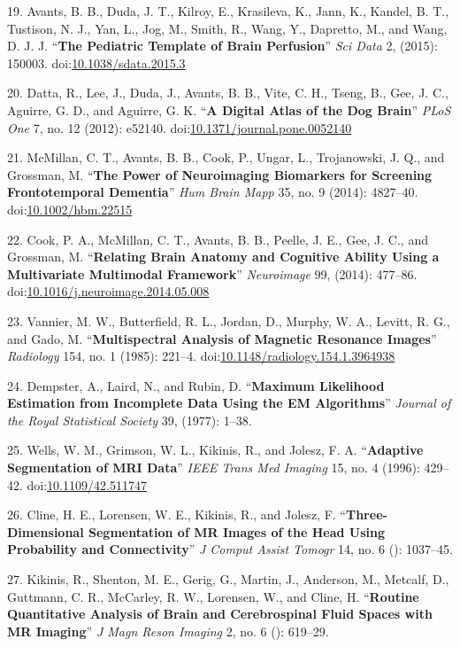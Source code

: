 \documentclass[11pt,]{article}
\begin{document}
19. Avants, B. B., Duda, J. T., Kilroy, E., Krasileva, K., Jann, K.,
Kandel, B. T., Tustison, N. J., Yan, L., Jog, M., Smith, R., Wang, Y.,
Dapretto, M., and Wang, D. J. J. ``\textbf{The Pediatric Template of
Brain Perfusion}'' \emph{Sci Data} 2, (2015): 150003.
doi:\href{http://dx.doi.org/10.1038/sdata.2015.3}{10.1038/sdata.2015.3}

20. Datta, R., Lee, J., Duda, J., Avants, B. B., Vite, C. H., Tseng, B.,
Gee, J. C., Aguirre, G. D., and Aguirre, G. K. ``\textbf{A Digital Atlas
of the Dog Brain}'' \emph{PLoS One} 7, no. 12 (2012): e52140.
doi:\href{http://dx.doi.org/10.1371/journal.pone.0052140}{10.1371/journal.pone.0052140}

21. McMillan, C. T., Avants, B. B., Cook, P., Ungar, L., Trojanowski, J.
Q., and Grossman, M. ``\textbf{The Power of Neuroimaging Biomarkers for
Screening Frontotemporal Dementia}'' \emph{Hum Brain Mapp} 35, no. 9
(2014): 4827--40.
doi:\href{http://dx.doi.org/10.1002/hbm.22515}{10.1002/hbm.22515}

22. Cook, P. A., McMillan, C. T., Avants, B. B., Peelle, J. E., Gee, J.
C., and Grossman, M. ``\textbf{Relating Brain Anatomy and Cognitive
Ability Using a Multivariate Multimodal Framework}'' \emph{Neuroimage}
99, (2014): 477--86.
doi:\href{http://dx.doi.org/10.1016/j.neuroimage.2014.05.008}{10.1016/j.neuroimage.2014.05.008}

23. Vannier, M. W., Butterfield, R. L., Jordan, D., Murphy, W. A.,
Levitt, R. G., and Gado, M. ``\textbf{Multispectral Analysis of Magnetic
Resonance Images}'' \emph{Radiology} 154, no. 1 (1985): 221--4.
doi:\href{http://dx.doi.org/10.1148/radiology.154.1.3964938}{10.1148/radiology.154.1.3964938}

24. Dempster, A., Laird, N., and Rubin, D. ``\textbf{Maximum Likelihood
Estimation from Incomplete Data Using the EM Algorithms}'' \emph{Journal
of the Royal Statistical Society} 39, (1977): 1--38.

25. Wells, W. M., Grimson, W. L., Kikinis, R., and Jolesz, F. A.
``\textbf{Adaptive Segmentation of MRI Data}'' \emph{IEEE Trans Med
Imaging} 15, no. 4 (1996): 429--42.
doi:\href{http://dx.doi.org/10.1109/42.511747}{10.1109/42.511747}

26. Cline, H. E., Lorensen, W. E., Kikinis, R., and Jolesz, F.
``\textbf{Three-Dimensional Segmentation of MR Images of the Head Using
Probability and Connectivity}'' \emph{J Comput Assist Tomogr} 14, no. 6
(): 1037--45.

27. Kikinis, R., Shenton, M. E., Gerig, G., Martin, J., Anderson, M.,
Metcalf, D., Guttmann, C. R., McCarley, R. W., Lorensen, W., and Cline,
H. ``\textbf{Routine Quantitative Analysis of Brain and Cerebrospinal
Fluid Spaces with MR Imaging}'' \emph{J Magn Reson Imaging} 2, no. 6 ():
619--29.
\end{document}
